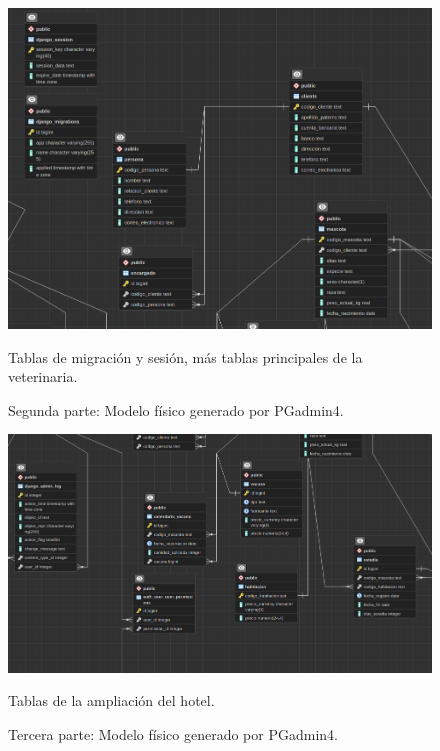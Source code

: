 \documentclass[
  12pt,
  hidelinks,
  a4paper,
  headings=standardclasses,
  headings=big,
  spanish
]{scrartcl}
\begin{document}
\begin{figure}[H]
  \centering
  \includegraphics[width=1\textwidth]{pgadmin-2.png}
  \caption{Segunda parte: Modelo físico generado por PGadmin4.}
  \medskip
  \small
  Tablas de migración y sesión, más tablas principales de la veterinaria.
\end{figure}

\begin{figure}[H]
  \centering
  \includegraphics[width=1\textwidth]{pgadmin-3.png}
  \caption{Tercera parte: Modelo físico generado por PGadmin4.}
  \medskip
  \small
  Tablas de la ampliación del hotel.
\end{figure}
\end{document}
